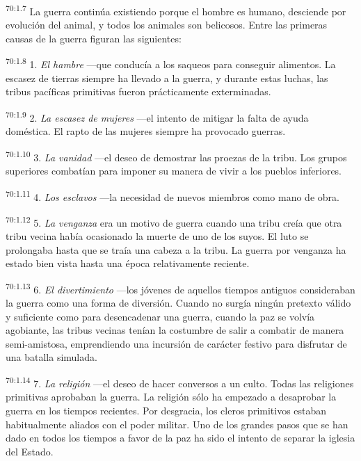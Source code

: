 \par
\textsuperscript{70:1.7} La guerra continúa existiendo porque el hombre es humano, desciende por evolución del animal, y todos los animales son belicosos. Entre las primeras causas de la guerra figuran las siguientes:

\par
\textsuperscript{70:1.8} 1. \textit{El hambre} ---que conducía a los saqueos para conseguir alimentos. La escasez de tierras siempre ha llevado a la guerra, y durante estas luchas, las tribus pacíficas primitivas fueron prácticamente exterminadas.

\par
\textsuperscript{70:1.9} 2. \textit{La escasez de mujeres} ---el intento de mitigar la falta de ayuda doméstica. El rapto de las mujeres siempre ha provocado guerras.

\par
\textsuperscript{70:1.10} 3. \textit{La vanidad} ---el deseo de demostrar las proezas de la tribu. Los grupos superiores combatían para imponer su manera de vivir a los pueblos inferiores.

\par
\textsuperscript{70:1.11} 4. \textit{Los esclavos} ---la necesidad de nuevos miembros como mano de obra.

\par
\textsuperscript{70:1.12} 5. \textit{La venganza} era un motivo de guerra cuando una tribu creía que otra tribu vecina había ocasionado la muerte de uno de los suyos. El luto se prolongaba hasta que se traía una cabeza a la tribu. La guerra por venganza ha estado bien vista hasta una época relativamente reciente.

\par
\textsuperscript{70:1.13} 6. \textit{El divertimiento} ---los jóvenes de aquellos tiempos antiguos consideraban la guerra como una forma de diversión. Cuando no surgía ningún pretexto válido y suficiente como para desencadenar una guerra, cuando la paz se volvía agobiante, las tribus vecinas tenían la costumbre de salir a combatir de manera semi-amistosa, emprendiendo una incursión de carácter festivo para disfrutar de una batalla simulada.

\par
\textsuperscript{70:1.14} 7. \textit{La religión} ---el deseo de hacer conversos a un culto. Todas las religiones primitivas aprobaban la guerra. La religión sólo ha empezado a desaprobar la guerra en los tiempos recientes. Por desgracia, los cleros primitivos estaban habitualmente aliados con el poder militar. Uno de los grandes pasos que se han dado en todos los tiempos a favor de la paz ha sido el intento de separar la iglesia del Estado.

